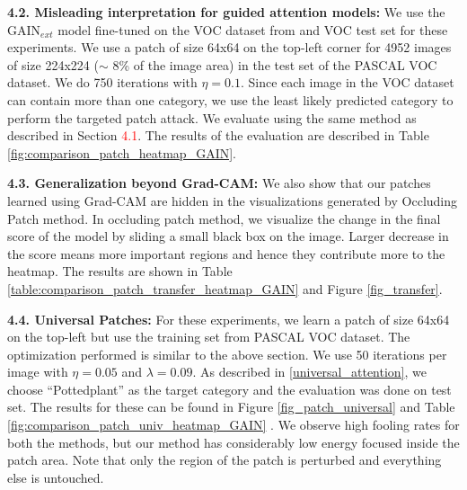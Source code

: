 \documentclass[10pt,twocolumn,letterpaper]{article}
\begin{document}
{\bf 4.2. Misleading interpretation for guided attention models:}
We use the GAIN{${_{ext}}$} model fine-tuned on the VOC dataset from \cite{kunpeng2018gain} and VOC test set for these experiments. We use a patch of size 64x64 on the top-left corner for 4952 images of size 224x224 ($\sim$ 8\% of the image area) in the test set of the PASCAL VOC dataset. We do 750 iterations with $\eta = 0.1$. Since each image in the VOC dataset can contain more than one category, we use the least likely predicted category to perform the targeted patch attack. We evaluate using the same method as described in Section
{\textcolor{red}{4.1}}. %
The results of the evaluation are described in Table \ref{fig:comparison_patch_heatmap_GAIN}.

{\bf 4.3. Generalization beyond Grad-CAM:} We also show that our patches learned using Grad-CAM are hidden in the visualizations generated by Occluding Patch \cite{zhou2014object} method. In occluding patch method, we visualize the change in the final score of the model by sliding a small black box on the image. Larger decrease in the score means more important regions and hence they contribute more to the heatmap. The results are shown in Table \ref{table:comparison_patch_transfer_heatmap_GAIN} and Figure \ref{fig_transfer}.


{\bf 4.4. Universal Patches:}
For these experiments, we learn a patch of size 64x64 on the top-left but use the training set from PASCAL VOC dataset. The optimization performed is similar to the above section. We use 50 iterations per image with $\eta=0.05$ and $\lambda = 0.09$. As described in \ref{universal_attention}, we choose ``Pottedplant'' as the target category and the evaluation was done on test set. The results for these can be found in Figure \ref{fig_patch_universal} and Table \ref{fig:comparison_patch_univ_heatmap_GAIN} . We observe high fooling rates for both the methods, but our method has considerably low energy focused inside the patch area. Note that only the region of the patch is perturbed and everything else is untouched.
\end{document}
